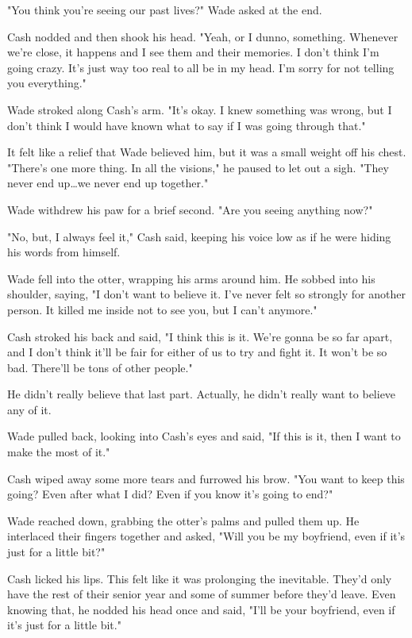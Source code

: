"You think you're seeing our past lives?" Wade asked at the end.

Cash nodded and then shook his head. "Yeah, or I dunno, something. Whenever we're close, it happens and I see them and their memories. I don't think I'm going crazy. It's just way too real to all be in my head. I'm sorry for not telling you everything."

Wade stroked along Cash's arm. "It's okay. I knew something was wrong, but I don't think I would have known what to say if I was going through that."

It felt like a relief that Wade believed him, but it was a small weight off his chest. "There's one more thing. In all the visions," he paused to let out a sigh. "They never end up\ldots we never end up together."

Wade withdrew his paw for a brief second. "Are you seeing anything now?"

"No, but, I always feel it," Cash said, keeping his voice low as if he were hiding his words from himself.

Wade fell into the otter, wrapping his arms around him. He sobbed into his shoulder, saying, "I don't want to believe it. I've never felt so strongly for another person. It killed me inside not to see you, but I can't anymore."

Cash stroked his back and said, "I think this is it. We're gonna be so far apart, and I don't think it'll be fair for either of us to try and fight it. It won't be so bad. There'll be tons of other people."

He didn't really believe that last part. Actually, he didn't really want to believe any of it.

Wade pulled back, looking into Cash's eyes and said, "If this is it, then I want to make the most of it."

Cash wiped away some more tears and furrowed his brow. "You want to keep this going? Even after what I did? Even if you know it's going to end?"

Wade reached down, grabbing the otter's palms and pulled them up. He interlaced their fingers together and asked, "Will you be my boyfriend, even if it's just for a little bit?"

Cash licked his lips. This felt like it was prolonging the inevitable. They'd only have the rest of their senior year and some of summer before they'd leave. Even knowing that, he nodded his head once and said, "I'll be your boyfriend, even if it's just for a little bit."

